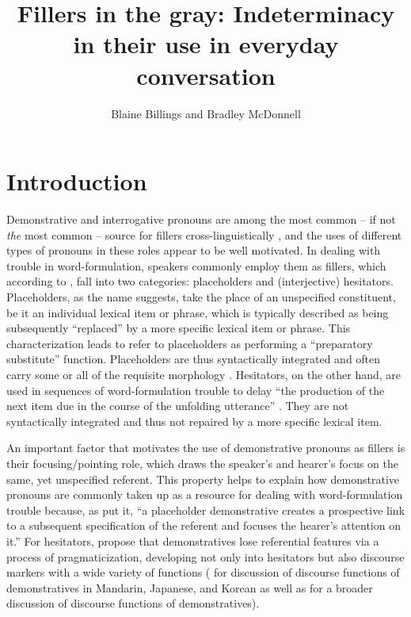 \documentclass[output=paper,colorlinks,citecolor=brown
\ChapterDOI{10.5281/zenodo.15697585}
]{langscibook}
\author{Blaine Billings\orcid{}\affiliation{University of Hawai'i at Mānoa} and  Bradley McDonnell\orcid{}\affiliation{University of Hawai'i at Mānoa}}
\title{Fillers in the gray: Indeterminacy in their use in everyday conversation}[Fillers in the gray: Indeterminacy in their use in everyday conversation]
\begin{document}
\maketitle
{}

\graphicspath{{figures/mcdonnell}}
\section{Introduction}
Demonstrative and interrogative pronouns are among the most common -- if not \emph{the} most common -- source for fillers cross-linguistically \citep[]{podlesskaya2010parameters}, and the uses of different types of pronouns in these roles appear to be well motivated. In dealing with trouble in word-formulation, speakers commonly employ them as fillers, which according to \textcite{hayashi2006crosslinguistic}, fall into two categories: placeholders and (interjective) hesitators. Placeholders, as the name suggests, take the place of an unspecified constituent, be it an individual lexical item or phrase, which is typically described as being subsequently ``replaced'' by a more specific lexical item or phrase. This characterization leads \citet[11]{podlesskaya2010parameters} to refer to placeholders as performing a ``preparatory substitute'' function. Placeholders are thus syntactically integrated and often carry some or all of the requisite morphology \parencite[][489]{hayashi2006crosslinguistic}. Hesitators, on the other hand, are used in sequences of word-formulation trouble to delay ``the production of the next item due in the course of the unfolding utterance'' \parencite[][507]{hayashi2006crosslinguistic}. They are not syntactically integrated and thus not repaired by a more specific lexical item.

An important factor that motivates the use of demonstrative pronouns as fillers is their focusing/pointing role, which draws the speaker's and hearer's focus on the same, yet unspecified referent. This property helps to explain how demonstrative pronouns are commonly taken up as a resource for dealing with word-formulation trouble because, as \citet[515]{hayashi2006crosslinguistic} put it, ``a placeholder demonstrative creates a prospective link to a subsequent specification of the referent and focuses the hearer's attention on it.'' For hesitators, \citet{hayashi2006crosslinguistic} propose that demonstratives lose referential features via a process of pragmaticization, developing not only into hesitators but also discourse markers with a wide variety of functions (\cite[see][525-529]{hayashi2006crosslinguistic} for discussion of discourse functions of demonstratives in Mandarin, Japanese, and Korean as well as \cite[][]{Næss2020} for a broader discussion of discourse functions of demonstratives).
\end{document}
